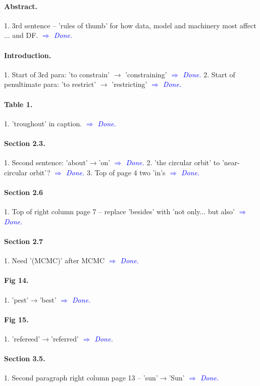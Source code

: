 \documentclass[10pt,a4paper]{article}
\newcommand{\Comment}[1]{\textsl{\textcolor{Blue}{$\Longrightarrow$ {#1}}}}
\begin{document}
\paragraph{Abstract.} 1. 3rd sentence -- 'rules of thumb' for how data, model and machinery most affect ... and DF. \Comment{Done.}

\paragraph{Introduction.} 1. Start of 3rd para: 'to constrain' $\rightarrow$ 'constraining'  \Comment{Done.} 2. Start of penultimate para: 'to restrict' $\rightarrow$ 'restricting' \Comment{Done.}

\paragraph{Table 1.} 1. 'troughout' in caption. \Comment{Done.}

\paragraph{Section 2.3.} 1. Second sentence: 'about'$\rightarrow$'on' \Comment{Done.} 2. 'the circular orbit' to 'near-circular orbit'? \Comment{Done.} 3. Top of page 4 two 'in's \Comment{Done.}

\paragraph{Section 2.6} 1. Top of right column page 7 -- replace 'besides' with 'not only... but also' \Comment{Done.}

\paragraph{Section 2.7} 1. Need '(MCMC)' after MCMC \Comment{Done.}

\paragraph{Fig 14.} 1. 'pest'$\rightarrow$'best' \Comment{Done.}

\paragraph{Fig 15.} 1. 'refereed'$\rightarrow$'referred'  \Comment{Done.}

\paragraph{Section 3.5.} 1. Second paragraph right column page 13 -- 'sun'$\rightarrow$'Sun' \Comment{Done.}
\end{document}
